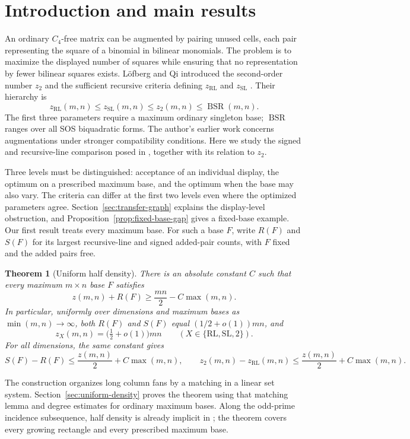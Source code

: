 \documentclass[11pt,a4paper]{article}
\newtheorem{theorem}{Theorem}[section]
\theoremstyle{definition}
\newcommand{\zr}{z_{\mathrm{RL}}}
\newcommand{\zs}{z_{\mathrm{SL}}}
\newcommand{\zt}{z_2}
\newcommand{\BSR}{\operatorname{BSR}}
\begin{document}
\section{Introduction and main results}
An ordinary $C_4$-free matrix can be augmented by pairing unused cells,
each pair representing the square of a binomial in bilinear monomials.
The problem is to maximize the displayed number of squares while ensuring
that no representation by fewer bilinear squares exists. L\"ofberg and Qi
introduced the second-order number $\zt$ and the sufficient recursive
criteria defining $\zr$ and $\zs$ \cite{LQ}. Their hierarchy is
\begin{equation}\label{eq:hierarchy}
 \zr(m,n)\le\zs(m,n)\le\zt(m,n)\le\BSR(m,n).
\end{equation}
The first three parameters require a maximum ordinary singleton base;
$\BSR$ ranges over all SOS biquadratic forms. The author's earlier work
\cite{LebedevAugmented} concerns augmentations under stronger compatibility
conditions. Here we study the signed and recursive-line comparison posed
in \cite{CCQ}, together with its relation to $\zt$.

Three levels must be distinguished: acceptance of an individual display,
the optimum on a prescribed maximum base, and the optimum when the base
may also vary. The criteria can differ at the first two levels even where
the optimized parameters agree. Section~\ref{sec:transfer-graph} explains
the display-level obstruction, and Proposition~\ref{prop:fixed-base-gap}
gives a fixed-base example. Our first result treats every maximum base.
For such a base $F$, write $R(F)$ and $S(F)$ for its largest recursive-line
and signed added-pair counts, with $F$ fixed and the added pairs free.

\begin{theorem}[Uniform half density]\label{thm:uniform-density}
There is an absolute constant $C$ such that every maximum $m\times n$
base $F$ satisfies
\[
 z(m,n)+R(F)\ge\frac{mn}{2}-C\max(m,n).
\]
In particular, uniformly over dimensions and maximum bases as
$\min(m,n)\to\infty$, both $R(F)$ and $S(F)$ equal
$(1/2+o(1))mn$, and
\[
 z_X(m,n)=\bigl(\tfrac12+o(1)\bigr)mn
 \qquad(X\in\{\mathrm{RL},\mathrm{SL},2\}).
\]
For all dimensions, the same constant gives
\[
 S(F)-R(F)\le\frac{z(m,n)}2+C\max(m,n),\qquad
 \zt(m,n)-\zr(m,n)\le\frac{z(m,n)}2+C\max(m,n).
\]
\end{theorem}



The construction organizes long column fans by a matching in a linear set
system. Section~\ref{sec:uniform-density} proves the theorem using that
matching lemma and degree estimates for ordinary maximum bases. Along the
odd-prime incidence subsequence, half density is already implicit in
\cite[Corollary~6.4]{LQ}; the theorem covers every growing rectangle and
every prescribed maximum base.
\end{document}
